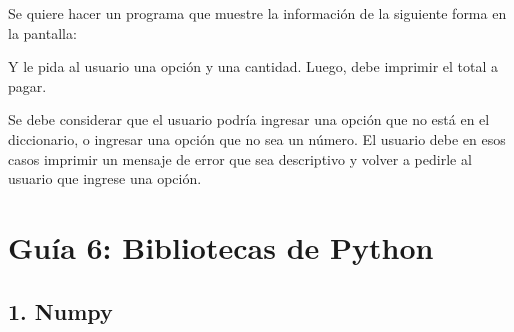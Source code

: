 \documentclass[
  letterpaper,
  DIV=11,
  numbers=noendperiod]{scrreprt}
\newenvironment{Shaded}{\begin{snugshade}}{\end{snugshade}}
\newcommand{\AttributeTok}[1]{\textcolor[rgb]{0.40,0.45,0.13}{#1}}
\newcommand{\ExtensionTok}[1]{\textcolor[rgb]{0.00,0.23,0.31}{#1}}
\newcommand{\NormalTok}[1]{\textcolor[rgb]{0.00,0.23,0.31}{#1}}
\newcommand{\VariableTok}[1]{\textcolor[rgb]{0.07,0.07,0.07}{#1}}
\begin{document}
\begin{enumerate}
  Se quiere hacer un programa que muestre la información de la siguiente
  forma en la pantalla:

\begin{Shaded}
\end{Shaded}

  Y le pida al usuario una opción y una cantidad. Luego, debe imprimir
  el total a pagar.

  Se debe considerar que el usuario podría ingresar una opción que no
  está en el diccionario, o ingresar una opción que no sea un número. El
  usuario debe en esos casos imprimir un mensaje de error que sea
  descriptivo y volver a pedirle al usuario que ingrese una opción.
\end{enumerate}


\chapter*{Guía 6: Bibliotecas de
Python}\label{guuxeda-6-bibliotecas-de-python}


\section*{1. Numpy}\label{numpy-1}

\end{document}
